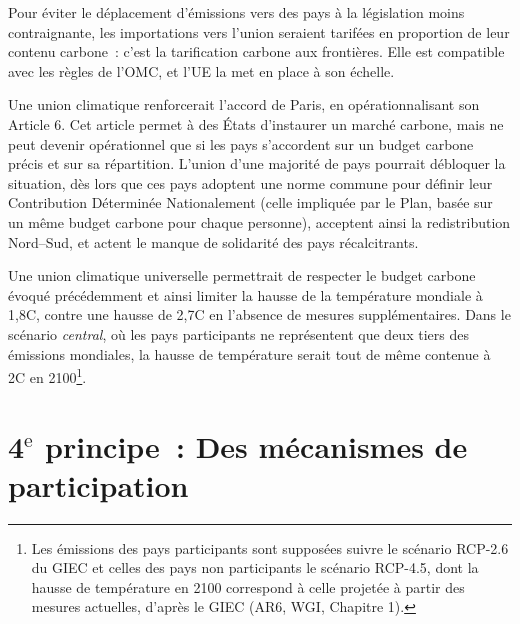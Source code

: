 \documentclass[a5paper,french,openany]{memoir}
\begin{document}

Pour éviter le déplacement d'émissions vers des pays à la législation moins contraignante, les importations vers l'union seraient tarifées en proportion de leur contenu carbone~: c'est la tarification carbone aux frontières. Elle est compatible avec les règles de l'OMC, et l'UE la met en place à son échelle.

Une union climatique renforcerait l'accord de Paris, en opérationnalisant son Article 6. Cet article permet à des États d'instaurer un marché carbone, mais ne peut devenir opérationnel que si les pays s'accordent sur un budget carbone précis et sur sa répartition. L'union d'une majorité de pays pourrait débloquer la situation, dès lors que ces pays adoptent une norme commune pour définir leur Contribution Déterminée Nationalement (celle impliquée par le Plan, basée sur un même budget carbone pour chaque personne), acceptent ainsi la redistribution Nord--Sud, et actent le manque de solidarité des pays récalcitrants. 

Une union climatique universelle permettrait de respecter le budget carbone évoqué précédemment et ainsi limiter la hausse de la température mondiale à 1,8\textdegree{}C, contre une hausse de 2,7\textdegree{}C en l'absence de mesures supplémentaires. Dans le scénario \textit{central}, où les pays participants ne représentent que deux tiers des émissions mondiales, la hausse de température serait tout de même contenue à 2\textdegree{}C en 2100\footnote{Les émissions des pays participants sont supposées suivre le scénario RCP-2.6 du GIEC et celles des pays non participants le scénario RCP-4.5, dont la hausse de température en 2100 correspond à celle projetée à partir des mesures actuelles, d'après le GIEC (AR6, WGI, Chapitre 1).}.%

\section{4$^\text{e}$ principe~: Des mécanismes de participation}
\end{document}
